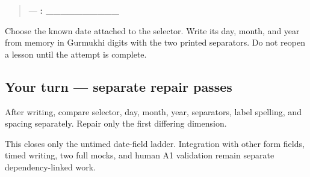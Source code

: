 \begin{quote}
 — \textbf{: \_\_\_\_\_\_\_\_\_\_}
\end{quote}

Choose the known date attached to the selector. Write its day, month, and year from memory in Gurmukhi digits with the two printed separators. Do not reopen a lesson until the attempt is complete.

\subsection*{Your turn — separate repair passes}
After writing, compare selector, day, month, year, separators, label spelling, and spacing separately. Repair only the first differing dimension.

\begin{tcolorbox}[breakable,colback=teal!4,colframe=teal!35!black,title={Before you move on}]
This closes only the untimed date-field ladder. Integration with other form fields, timed writing, two full mocks, and human A1 validation remain separate dependency-linked work.
\end{tcolorbox}
